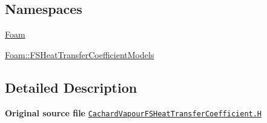 \subsection*{Namespaces}
\begin{DoxyCompactItemize}
\item 
 \hyperlink{namespaceFoam}{Foam}
\item 
 \hyperlink{namespaceFoam_1_1FSHeatTransferCoefficientModels}{Foam\+::\+F\+S\+Heat\+Transfer\+Coefficient\+Models}
\end{DoxyCompactItemize}


\subsection{Detailed Description}
{\bfseries Original source file} \href{../../../home/carlo/data/GeN-Foam/GeN-Foam_ffn/GeN-Foam/GeN-Foam/classes/thermalHydraulics/src/physicsModels/heatTransferModels/FSHeatTransferCoefficientModels/subModels/postCHFModels/CachardVapour/CachardVapourFSHeatTransferCoefficient.H}{\tt Cachard\+Vapour\+F\+S\+Heat\+Transfer\+Coefficient.\+H} 